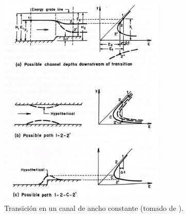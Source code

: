 \documentclass[11pt, oneside]{article}
\begin{document}
\begin{figure}[h]
\centering
\includegraphics[width=8cm]{fig28.jpeg}
\caption{Transici\'on en un canal de ancho constante (tomado de \cite{Chau}).}
\label{fig12}
\end{figure}
\end{document}
